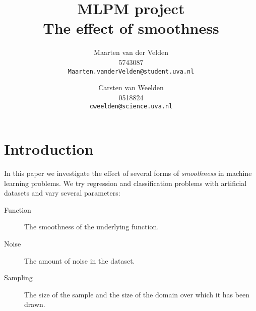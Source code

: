 \documentclass[a4paper]{article}
\begin{document}
\title{MLPM project \\ The effect of smoothness}
\author{Maarten van der Velden \\ 5743087 \\ \texttt{Maarten.vanderVelden@student.uva.nl} \and Carsten van Weelden \\ 0518824 \\ \texttt{cweelden@science.uva.nl}}
\maketitle


\acresetall

\section{Introduction}
\label{sec:introduction}

In this paper we investigate the effect of several forms of \emph{smoothness} in machine learning problems. We try regression and classification problems with artificial datasets and vary several parameters:
\begin{description}
\item[Function] The smoothness of the underlying function.
\item[Noise] The amount of noise in the dataset.
\item[Sampling] The size of the sample and the size of the domain over which it has been drawn.
\end{description}

\end{document}
